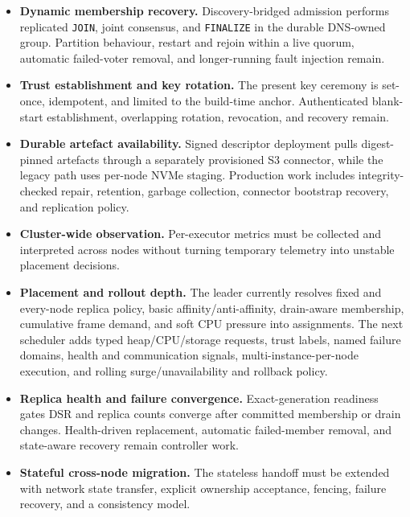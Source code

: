 \begin{itemize}
    \item \textbf{Dynamic membership recovery.} Discovery-bridged admission
        performs replicated \texttt{JOIN}, joint consensus, and
        \texttt{FINALIZE} in the durable DNS-owned group. Partition behaviour,
        restart and rejoin within a live quorum, automatic failed-voter
        removal, and longer-running fault injection remain.

    \item \textbf{Trust establishment and key rotation.} The present key
        ceremony is set-once, idempotent, and limited to the build-time
        anchor. Authenticated blank-start establishment, overlapping
        rotation, revocation, and recovery remain.

    \item \textbf{Durable artefact availability.} Signed descriptor deployment
        pulls digest-pinned artefacts through a separately provisioned S3
        connector, while the legacy path uses per-node NVMe staging. Production work
        includes integrity-checked repair, retention, garbage collection,
        connector bootstrap recovery, and replication policy.

    \item \textbf{Cluster-wide observation.} Per-executor metrics must be
        collected and interpreted across nodes without turning temporary
        telemetry into unstable placement decisions.

    \item \textbf{Placement and rollout depth.} The leader currently resolves
        fixed and every-node replica policy, basic affinity/anti-affinity,
        drain-aware membership, cumulative frame demand, and soft CPU pressure
        into assignments. The next scheduler adds typed heap/CPU/storage
        requests, trust labels, named failure domains, health and communication
        signals, multi-instance-per-node execution, and rolling
        surge/unavailability and rollback policy.

    \item \textbf{Replica health and failure convergence.} Exact-generation
        readiness gates DSR and replica counts converge after committed
        membership or drain changes. Health-driven replacement, automatic
        failed-member removal, and state-aware recovery remain controller work.

    \item \textbf{Stateful cross-node migration.} The stateless handoff must
        be extended with network state transfer, explicit ownership
        acceptance, fencing, failure recovery, and a consistency model.


\end{itemize}
